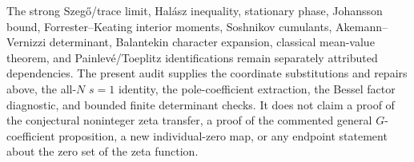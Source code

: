 The strong Szeg\H{o}/trace limit, Hal\'asz inequality, stationary phase, Johansson bound,
Forrester--Keating interior moments, Soshnikov cumulants, Akemann--Vernizzi determinant,
Balantekin character expansion, classical mean-value theorem, and Painlev\'e/Toeplitz
identifications remain separately attributed dependencies.  The present audit supplies the
coordinate substitutions and repairs above, the all-$N$ $s=1$ identity, the pole-coefficient
extraction, the Bessel factor diagnostic, and bounded finite determinant checks.  It does not
claim a proof of the conjectural noninteger zeta transfer, a proof of the commented general
$G$-coefficient proposition, a new individual-zero map, or any endpoint statement about the
zero set of the zeta function.

